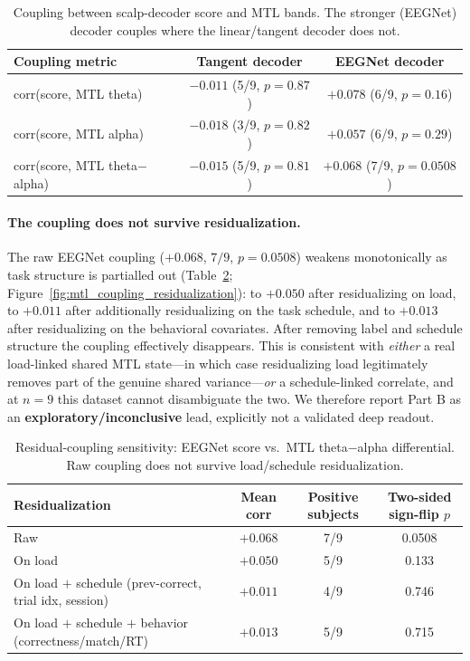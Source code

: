 \documentclass[11pt]{article}
\begin{document}
\begin{table}[h]
\centering
\caption{Coupling between scalp-decoder score and MTL bands. The stronger (EEGNet) decoder couples
where the linear/tangent decoder does not.}
\label{tab:coupling}
\begin{tabular}{lcc}
\toprule
Coupling metric & Tangent decoder & EEGNet decoder \\
\midrule
corr(score, MTL theta) & $-0.011$ (5/9, $p{=}0.87$) & $+0.078$ (6/9, $p{=}0.16$) \\
corr(score, MTL alpha) & $-0.018$ (3/9, $p{=}0.82$) & $+0.057$ (6/9, $p{=}0.29$) \\
corr(score, MTL theta$-$alpha) & $-0.015$ (5/9, $p{=}0.81$) & $+0.068$ (7/9, $p{=}0.0508$) \\
\bottomrule
\end{tabular}
\end{table}

\paragraph{The coupling does not survive residualization.} The raw EEGNet coupling
($+0.068$, $7/9$, $p=0.0508$) weakens monotonically as task structure is partialled out
(Table~\ref{tab:residual}; Figure~\ref{fig:mtl_coupling_residualization}): to $+0.050$ after residualizing on load, to $+0.011$ after additionally
residualizing on the task schedule, and to $+0.013$ after residualizing on the behavioral
covariates. After removing label and schedule structure the coupling effectively disappears. This is
consistent with \emph{either} a real load-linked shared MTL state---in which case residualizing load
legitimately removes part of the genuine shared variance---\emph{or} a schedule-linked correlate,
and at $n=9$ this dataset cannot disambiguate the two. We therefore report Part B as an
\textbf{exploratory/inconclusive} lead, explicitly not a validated deep readout.

\begin{table}[h]
\centering
\caption{Residual-coupling sensitivity: EEGNet score vs.\ MTL theta$-$alpha differential. Raw
coupling does not survive load/schedule residualization.}
\label{tab:residual}
\begin{tabular}{lccc}
\toprule
Residualization & Mean corr & Positive subjects & Two-sided sign-flip $p$ \\
\midrule
Raw & $+0.068$ & 7/9 & 0.0508 \\
On load & $+0.050$ & 5/9 & 0.133 \\
On load $+$ schedule (prev-correct, trial idx, session) & $+0.011$ & 4/9 & 0.746 \\
On load $+$ schedule $+$ behavior (correctness/match/RT) & $+0.013$ & 5/9 & 0.715 \\
\bottomrule
\end{tabular}
\end{table}
\end{document}
